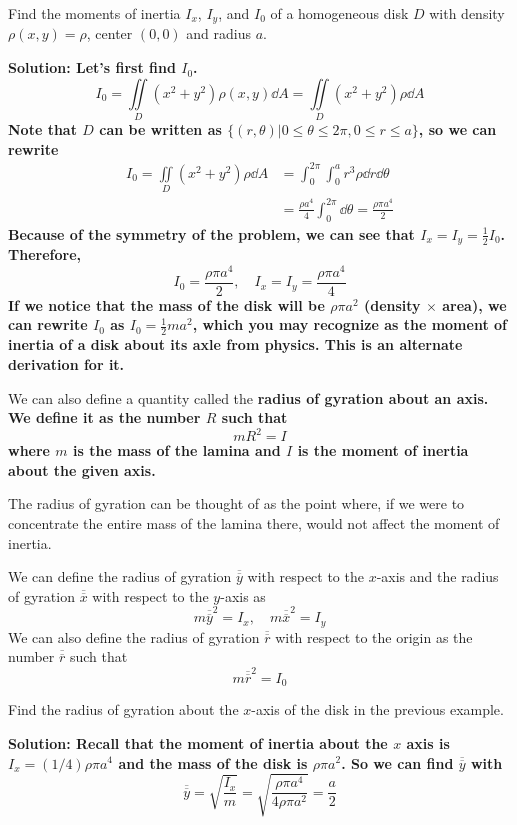 \begin{example}
    Find the moments of inertia \(I_x\), \(I_y\), and \(I_0\) of a homogeneous disk \(D\) with density \(\rho(x,y) = \rho\), center \((0,0)\) and radius \(a\). \par
    \bf{Solution: }Let's first find \(I_0\).
    \[ I_0 = \iint\limits_D (x^2+y^2)\rho(x,y)\dd A = \iint\limits_D (x^2+y^2)\rho\dd A \]
    Note that \(D\) can be written as \( \{(r,\theta)| 0\leq\theta\leq2\pi, 0\leq r\leq a\} \), so we can rewrite
    \begin{align*}
        I_0 = \iint\limits_D(x^2+y^2)\rho \dd A &= \int_0^{2\pi}\int_0^ar^3\rho \dd r\dd \theta \\
        &= \frac{\rho a^4}{4}\int_0^{2\pi}\dd \theta = \frac{\rho\pi a^4}{2}
    \end{align*}
    Because of the symmetry of the problem, we can see that $I_x = I_y = \frac{1}{2}I_0$. Therefore,
    \[ \boxed{I_0 = \frac{\rho\pi a^4}{2}, \quad I_x = I_y = \frac{\rho\pi a^4}{4}} \]
    If we notice that the mass of the disk will be \(\rho\pi a^2\) (density $\times$ area), we can rewrite \( I_0\) as \( I_0 = \frac{1}{2}ma^2 \), which you may recognize as the moment of inertia of a disk about its axle from physics. This is an alternate derivation for it.
\end{example}
We can also define a quantity called the \bf{radius of gyration} about an axis. We define it as the number \( R \) such that 
\[ mR^2 = I \]
where \( m \) is the mass of the lamina and \( I \) is the moment of inertia about the given axis. \par 
The radius of gyration can be thought of as the point where, if we were to concentrate the entire mass of the lamina there, would not affect the moment of inertia. \par 
We can define the radius of gyration \( \overline{\overline{y}} \) with respect to the $x$-axis and the radius of gyration \( \overline{\overline{x}} \) with respect to the $y$-axis as 
\[ m\overline{\overline{y}}^2 = I_x, \quad m\overline{\overline{x}}^2 = I_y\]
We can also define the radius of gyration \( \overline{\overline{r}} \) with respect to the origin as the number $\overline{\overline{r}}$ such that
\[ m\overline{\overline{r}}^2 = I_0 \]
\begin{example}
    Find the radius of gyration about the $x$-axis of the disk in the previous example.\par
    \bf{Solution: }Recall that the moment of inertia about the $x$ axis is \( I_x = (1/4)\rho \pi a^4 \) and the mass of the disk is \( \rho \pi a^2\). So we can find \( \overline{\overline{y}} \) with
    \[ \overline{\overline{y}} = \sqrt{\frac{I_x}{m}} = \sqrt{\frac{\rho \pi a^4}{4\rho \pi a^2}} = \frac{a}{2}\]
\end{example}
